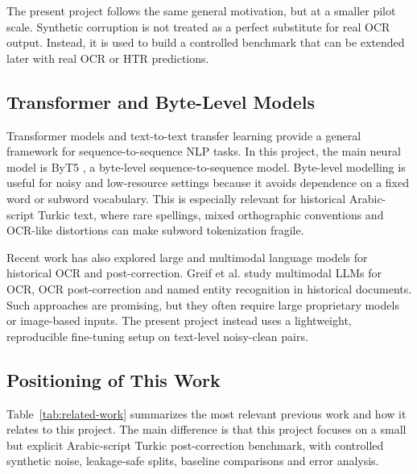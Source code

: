 \documentclass{article}
\begin{document}
The present project follows the same general motivation, but at a smaller pilot scale. Synthetic corruption is not treated as a perfect substitute for real OCR output. Instead, it is used to build a controlled benchmark that can be extended later with real OCR or HTR predictions.

\subsection{Transformer and Byte-Level Models}

Transformer models \cite{vaswani2017attention} and text-to-text transfer learning \cite{raffel2020exploring} provide a general framework for sequence-to-sequence NLP tasks. In this project, the main neural model is ByT5 \cite{xue2022byt5}, a byte-level sequence-to-sequence model. Byte-level modelling is useful for noisy and low-resource settings because it avoids dependence on a fixed word or subword vocabulary. This is especially relevant for historical Arabic-script Turkic text, where rare spellings, mixed orthographic conventions and OCR-like distortions can make subword tokenization fragile.

Recent work has also explored large and multimodal language models for historical OCR and post-correction. Greif et al. \cite{greif2025multimodal} study multimodal LLMs for OCR, OCR post-correction and named entity recognition in historical documents. Such approaches are promising, but they often require large proprietary models or image-based inputs. The present project instead uses a lightweight, reproducible fine-tuning setup on text-level noisy-clean pairs.

\subsection{Positioning of This Work}

Table~\ref{tab:related-work} summarizes the most relevant previous work and how it relates to this project. The main difference is that this project focuses on a small but explicit Arabic-script Turkic post-correction benchmark, with controlled synthetic noise, leakage-safe splits, baseline comparisons and error analysis.

\begin{table}[tbh!]
\begin{center}
\scriptsize

\caption{Comparison with related work on historical OCR, Arabic-script OCR and OCR post-correction.}
\label{tab:related-work}
\end{center}
\end{table}
\end{document}
